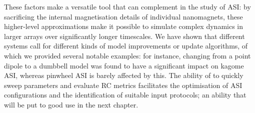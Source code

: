 These factors make \hotspice a versatile tool that can complement  in the study of ASI: by sacrificing the internal magnetisation details of individual nanomagnets, these higher-level approximations make it possible to simulate complex dynamics in larger arrays over significantly longer timescales.
We have shown that different systems call for different kinds of model improvements or update algorithms, of which we provided several notable examples: for instance, changing from a point dipole to a dumbbell model was found to have a significant impact on kagome ASI, whereas pinwheel ASI is barely affected by this. %
The ability of \hotspice to quickly sweep parameters and evaluate RC metrics facilitates the optimisation of ASI configurations and the identification of suitable input protocols; an ability that will be put to good use in the next chapter.

